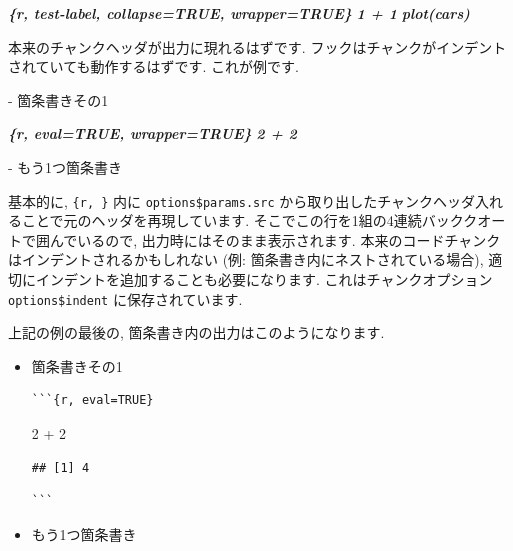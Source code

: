 \documentclass[
  11pt,
]{bxjsreport}
\newenvironment{Shaded}{\begin{snugshade}}{\end{snugshade}}
\newcommand{\DecValTok}[1]{\textcolor[rgb]{0.00,0.00,0.81}{#1}}
\newcommand{\InformationTok}[1]{\textcolor[rgb]{0.56,0.35,0.01}{\textbf{\textit{#1}}}}
\newcommand{\NormalTok}[1]{#1}
\newcommand{\SpecialCharTok}[1]{\textcolor[rgb]{0.00,0.00,0.00}{#1}}
\newcommand{\SpecialStringTok}[1]{\textcolor[rgb]{0.31,0.60,0.02}{#1}}
\renewenvironment{quote}{\begin{VF}}{\end{VF}}
\renewenvironment{quote}{\def\FrameCommand{{\color{quotebarcolor}{\vrule width 3pt}}\hspace{10pt}}\MakeFramed{\advance\hsize-\width\FrameRestore}}{\endMakeFramed}
\begin{document}
\begin{Shaded}
\begin{Highlighting}[]
\InformationTok{\textasciigrave{}\textasciigrave{}\textasciigrave{}\{r, test{-}label, collapse=TRUE, wrapper=TRUE\}}
\InformationTok{1 + 1}
\InformationTok{plot(cars)}
\InformationTok{\textasciigrave{}\textasciigrave{}\textasciigrave{}}

\NormalTok{本来のチャンクヘッダが出力に現れるはずです. フックはチャンクがインデントされていても動作するはずです. これが例です.}

\SpecialStringTok{{-} }\NormalTok{箇条書きその1}

  \InformationTok{\textasciigrave{}\textasciigrave{}\textasciigrave{}\{r, eval=TRUE, wrapper=TRUE\}}
\InformationTok{  2 + 2}
\InformationTok{  \textasciigrave{}\textasciigrave{}\textasciigrave{}}

\SpecialStringTok{{-} }\NormalTok{もう1つ箇条書き}
\end{Highlighting}
\end{Shaded}

基本的に, \texttt{\textasciigrave{}\textasciigrave{}\textasciigrave{}\{r,\ \}} 内に \texttt{options\$params.src} から取り出したチャンクヘッダ入れることで元のヘッダを再現しています. そこでこの行を1組の4連続バッククオートで囲んでいるので, 出力時にはそのまま表示されます. 本来のコードチャンクはインデントされるかもしれない (例: 箇条書き内にネストされている場合), 適切にインデントを追加することも必要になります. これはチャンクオプション \texttt{options\$indent} に保存されています.

上記の例の最後の, 箇条書き内の出力はこのようになります.

\begin{quote}
\begin{itemize}
\item
  箇条書きその1

\begin{verbatim}
```{r, eval=TRUE}
\end{verbatim}

\begin{Shaded}
\begin{Highlighting}[]
\DecValTok{2} \SpecialCharTok{+} \DecValTok{2}
\end{Highlighting}
\end{Shaded}

\begin{verbatim}
## [1] 4
\end{verbatim}

\begin{verbatim}
```
\end{verbatim}
\item
  もう1つ箇条書き
\end{itemize}
\end{quote}
\end{document}
